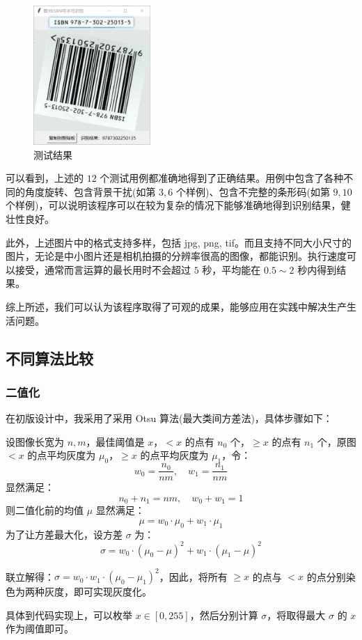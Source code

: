 \documentclass{ctexart}
\begin{document}
\begin{figure}[H]
    \includegraphics[height=150pt]{test_12}
    \caption{测试结果}
\end{figure}

可以看到，上述的 $12$ 个测试用例都准确地得到了正确结果。用例中包含了各种不同的角度旋转、包含背景干扰(如第 $3,6$ 个样例)、包含不完整的条形码(如第 $9,10$ 个样例)，可以说明该程序可以在较为复杂的情况下能够准确地得到识别结果，健壮性良好。

此外，上述图片中的格式支持多样，包括 jpg, png, tif。而且支持不同大小尺寸的图片，无论是中小图片还是相机拍摄的分辨率很高的图像，都能识别。执行速度可以接受，通常而言运算的最长用时不会超过 $5$ 秒，平均能在 $0.5\sim2$ 秒内得到结果。

综上所述，我们可以认为该程序取得了可观的成果，能够应用在实践中解决生产生活问题。

\subsection{不同算法比较}

\subsubsection{二值化}
在初版设计中，我采用了采用 Otsu 算法(最大类间方差法)，具体步骤如下：

设图像长宽为 $n,m$，最佳阈值是 $x$，$< x$ 的点有 $n_0$ 个，$\ge x$ 的点有 $n_1$ 个，原图 $< x$ 的点平均灰度为 $\mu_0$，$\ge x$ 的点平均灰度为 $\mu_1$，令：
\[w_0=\frac{n_0}{nm},\quad w_1=\frac{n_1}{nm}\]
显然满足：
\[n_0+n_1=nm,\quad w_0+w_1=1\]
则二值化前的均值 $\mu$ 显然满足：
\[\mu=w_0\cdot\mu_0+w_1\cdot\mu_1\]
为了让方差最大化，设方差 $\sigma$ 为：
\[\sigma=w_0\cdot(\mu_0-\mu)^2+w_1\cdot(\mu_1-\mu)^2\]

联立解得：$\sigma=w_0\cdot w_1\cdot (\mu_0-\mu_1)^2$，因此，将所有 $\ge x$ 的点与 $< x$ 的点分别染色为两种灰度，即可实现灰度化。

具体到代码实现上，可以枚举 $x\in[0,255]$，然后分别计算 $\sigma$，将取得最大 $\sigma$ 的 $x$ 作为阈值即可。
\end{document}
